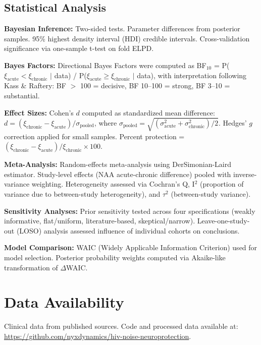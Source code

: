 \documentclass[10pt,a4paper]{article}
\begin{document}
\subsection{Statistical Analysis}

\textbf{Bayesian Inference:} Two-sided tests. Parameter differences from posterior samples. 95\% highest density interval (HDI) credible intervals. Cross-validation significance via one-sample t-test on fold ELPD.

\textbf{Bayes Factors:} Directional Bayes Factors were computed as BF$_{10}$ = P($\xi_{\text{acute}} < \xi_{\text{chronic}}$ $|$ data) / P($\xi_{\text{acute}} \geq \xi_{\text{chronic}}$ $|$ data), with interpretation following Kass \& Raftery\cite{kass1995}: BF $>$ 100 = decisive, BF 10--100 = strong, BF 3--10 = substantial.

\textbf{Effect Sizes:} Cohen's $d$ computed as standardized mean difference: $d = (\xi_{\text{chronic}} - \xi_{\text{acute}}) / \sigma_{\text{pooled}}$, where $\sigma_{\text{pooled}} = \sqrt{(\sigma_{\text{acute}}^2 + \sigma_{\text{chronic}}^2)/2}$. Hedges' $g$ correction applied for small samples. Percent protection = $(\xi_{\text{chronic}} - \xi_{\text{acute}}) / \xi_{\text{chronic}} \times 100$.

\textbf{Meta-Analysis:} Random-effects meta-analysis using DerSimonian-Laird estimator. Study-level effects (NAA acute-chronic difference) pooled with inverse-variance weighting. Heterogeneity assessed via Cochran's Q, I$^2$ (proportion of variance due to between-study heterogeneity), and $\tau^2$ (between-study variance).

\textbf{Sensitivity Analyses:} Prior sensitivity tested across four specifications (weakly informative, flat/uniform, literature-based, skeptical/narrow). Leave-one-study-out (LOSO) analysis assessed influence of individual cohorts on conclusions.

\textbf{Model Comparison:} WAIC (Widely Applicable Information Criterion) used for model selection. Posterior probability weights computed via Akaike-like transformation of $\Delta$WAIC.

\section*{Data Availability}

Clinical data from published sources\cite{sailasuta2012,young2014,valcour2012}. Code and processed data available at: \url{https://github.com/nyxdynamics/hiv-noise-neuroprotection}.
\end{document}
